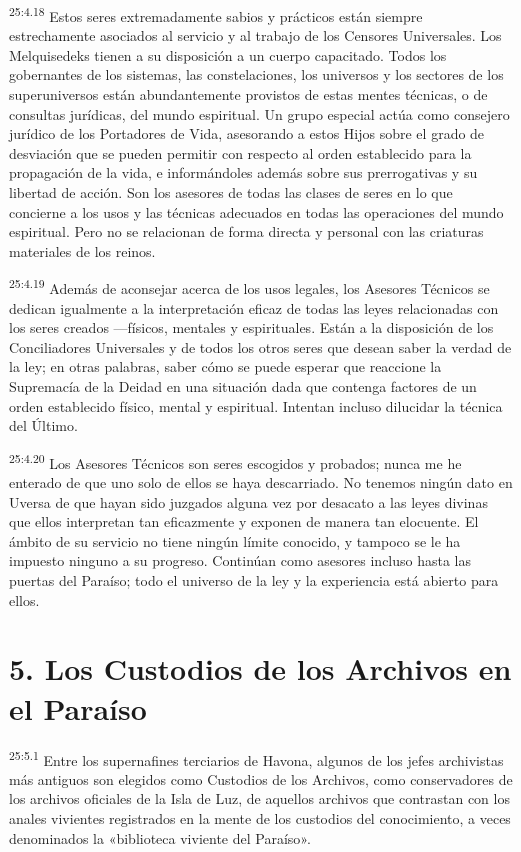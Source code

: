 \par
\textsuperscript{25:4.18} Estos seres extremadamente sabios y prácticos están siempre estrechamente asociados al servicio y al trabajo de los Censores Universales. Los Melquisedeks tienen a su disposición a un cuerpo capacitado. Todos los gobernantes de los sistemas, las constelaciones, los universos y los sectores de los superuniversos están abundantemente provistos de estas mentes técnicas, o de consultas jurídicas, del mundo espiritual. Un grupo especial actúa como consejero jurídico de los Portadores de Vida, asesorando a estos Hijos sobre el grado de desviación que se pueden permitir con respecto al orden establecido para la propagación de la vida, e informándoles además sobre sus prerrogativas y su libertad de acción. Son los asesores de todas las clases de seres en lo que concierne a los usos y las técnicas adecuados en todas las operaciones del mundo espiritual. Pero no se relacionan de forma directa y personal con las criaturas materiales de los reinos.

\par
\textsuperscript{25:4.19} Además de aconsejar acerca de los usos legales, los Asesores Técnicos se dedican igualmente a la interpretación eficaz de todas las leyes relacionadas con los seres creados ---físicos, mentales y espirituales. Están a la disposición de los Conciliadores Universales y de todos los otros seres que desean saber la verdad de la ley; en otras palabras, saber cómo se puede esperar que reaccione la Supremacía de la Deidad en una situación dada que contenga factores de un orden establecido físico, mental y espiritual. Intentan incluso dilucidar la técnica del Último.

\par
\textsuperscript{25:4.20} Los Asesores Técnicos son seres escogidos y probados; nunca me he enterado de que uno solo de ellos se haya descarriado. No tenemos ningún dato en Uversa de que hayan sido juzgados alguna vez por desacato a las leyes divinas que ellos interpretan tan eficazmente y exponen de manera tan elocuente. El ámbito de su servicio no tiene ningún límite conocido, y tampoco se le ha impuesto ninguno a su progreso. Continúan como asesores incluso hasta las puertas del Paraíso; todo el universo de la ley y la experiencia está abierto para ellos.

\section*{5. Los Custodios de los Archivos en el Paraíso}
\par
\textsuperscript{25:5.1} Entre los supernafines terciarios de Havona, algunos de los jefes archivistas más antiguos son elegidos como Custodios de los Archivos, como conservadores de los archivos oficiales de la Isla de Luz, de aquellos archivos que contrastan con los anales vivientes registrados en la mente de los custodios del conocimiento, a veces denominados la «biblioteca viviente del Paraíso».

